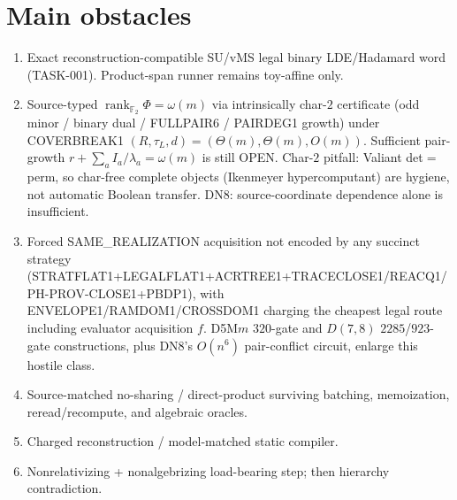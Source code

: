 \documentclass[11pt]{article}
\begin{document}
\section*{Main obstacles}
\begin{enumerate}
\item Exact reconstruction-compatible SU/vMS legal binary LDE/Hadamard word
(TASK-001). Product-span runner remains toy-affine only.
\item Source-typed $\operatorname{rank}_{\mathbb F_2}\Phi=\omega(m)$ via
intrinsically char-$2$ certificate (odd minor / binary dual / FULLPAIR6 /
PAIRDEG1 growth) under COVERBREAK1
$(R,\tau_L,d)=(\Theta(m),\Theta(m),O(m))$. Sufficient pair-growth
$r+\sum_a I_a/\lambda_a=\omega(m)$ is still OPEN. Char-$2$ pitfall: Valiant
det$=$perm, so char-free complete objects (Ikenmeyer hypercomputant) are
hygiene, not automatic Boolean transfer. DN8: source-coordinate dependence
alone is insufficient.
\item Forced SAME\_REALIZATION acquisition not encoded by any succinct strategy
(STRATFLAT1+LEGALFLAT1+ACRTREE1+TRACECLOSE1/REACQ1/PH-PROV-CLOSE1+PBDP1), with
ENVELOPE1/RAMDOM1/CROSSDOM1 charging the cheapest legal route including
evaluator acquisition $f$. D5M$m$ $320$-gate and $D(7,8)$ $2285$/$923$-gate
constructions, plus DN8's $O(n^6)$ pair-conflict circuit, enlarge this hostile
class.
\item Source-matched no-sharing / direct-product surviving batching, memoization,
reread/recompute, and algebraic oracles.
\item Charged reconstruction / model-matched static compiler.
\item Nonrelativizing + nonalgebrizing load-bearing step; then hierarchy
contradiction.
\end{enumerate}
\end{document}
